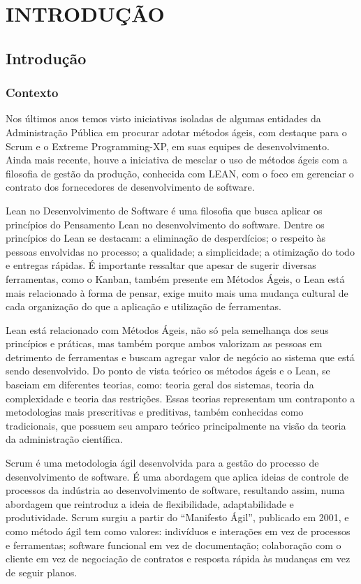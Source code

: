 \part{INTRODUÇÃO}

\chapter[Introdução]{Introdução}



\section[Contexto]{Contexto}

Nos últimos anos temos visto iniciativas isoladas de algumas entidades da Administração Pública em procurar adotar métodos ágeis, com destaque para o Scrum e o Extreme Programming-XP, em suas equipes de desenvolvimento. Ainda mais recente, houve a iniciativa de mesclar o uso de métodos ágeis com a filosofia de gestão da produção, conhecida com LEAN, com o foco em gerenciar o contrato dos fornecedores de desenvolvimento de software.

Lean no Desenvolvimento de Software é uma filosofia que busca aplicar os princípios do Pensamento Lean no desenvolvimento do software. Dentre os princípios do Lean se destacam: a eliminação de desperdícios; o respeito às pessoas envolvidas no processo; a qualidade; a simplicidade; a otimização do todo e entregas rápidas. É importante ressaltar que apesar de sugerir diversas ferramentas, como o Kanban, também presente em Métodos Ágeis, o Lean está mais relacionado à forma de pensar, exige muito mais uma mudança cultural de cada organização do que a aplicação e utilização de ferramentas. 

Lean está relacionado com Métodos Ágeis, não só pela semelhança dos seus princípios e práticas, mas também porque ambos valorizam as pessoas em detrimento de ferramentas e buscam agregar valor de negócio ao sistema que está sendo desenvolvido. Do ponto de vista teórico os métodos ágeis e o Lean, se baseiam em diferentes teorias, como: teoria geral dos sistemas, teoria da complexidade e teoria das restrições. Essas teorias representam um contraponto a metodologias mais prescritivas e preditivas, também conhecidas como tradicionais, que possuem seu amparo teórico principalmente na visão da teoria da administração científica.

Scrum é uma metodologia ágil desenvolvida para a gestão do processo de desenvolvimento de software. É uma abordagem que aplica ideias de controle de processos da indústria ao desenvolvimento de software, resultando assim, numa abordagem que reintroduz a ideia de flexibilidade, adaptabilidade e produtividade. Scrum surgiu a partir do “Manifesto Ágil”, publicado em 2001, e como método ágil tem como valores: indivíduos e interações em vez de processos e ferramentas; software funcional em vez de documentação; colaboração com o cliente em vez de negociação de contratos e resposta rápida às mudanças em vez de seguir planos. 

